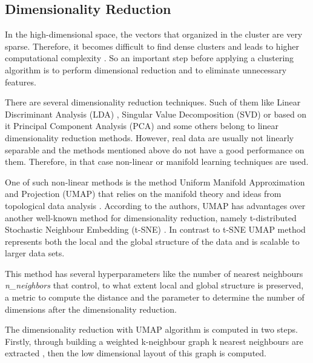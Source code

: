 \documentclass[fontsize=12pt,a4paper,twoside,openany]{scrbook}
\begin{document}
\subsection{Dimensionality Reduction}
\label{sec:umap}

In the high-dimensional space, the vectors that organized in the cluster are very sparse. Therefore, it becomes difficult to find dense clusters and leads to higher computational complexity \parencite{Angelov20}. So an important step before applying a clustering algorithm is to perform dimensional reduction and to eliminate unnecessary features.

There are several dimensionality reduction techniques. Such of them like Linear Discriminant Analysis (LDA) \parencite{Tharwat17}, Singular Value Decomposition (SVD) \parencite{Klema80} or based on it Principal Component Analysis (PCA) \parencite{Hotelling33, Jolliffe86} and some others belong to linear dimensionality reduction methods. However, real data are usually not linearly separable and the methods mentioned above do not have a good performance on them. Therefore, in that case non-linear or manifold learning techniques are used. 

One of such non-linear methods is the method Uniform Manifold Approximation and Projection (UMAP) that relies on the manifold theory and ideas from topological data analysis \parencite{McInnes18, McInnes20}. According to the authors, UMAP has advantages over another well-known method for dimensionality reduction, namely t-distributed Stochastic Neighbour Embedding (t-SNE) \parencite{Maaten08}. In contrast to t-SNE UMAP method represents both the local and the global structure of the data and is scalable to larger data sets. 

This method has several hyperparameters like the number of nearest neighbours \emph{n\_neighbors} that control, to what extent local and global structure is preserved, a metric to compute the distance and the parameter to determine the number of dimensions after the dimensionality reduction.

The dimensionality reduction with UMAP algorithm is computed in two steps. Firstly, through building a weighted k-neighbour graph k nearest neighbours are extracted \parencite{McInnes20}, then the low dimensional layout of this graph is computed.
\end{document}
